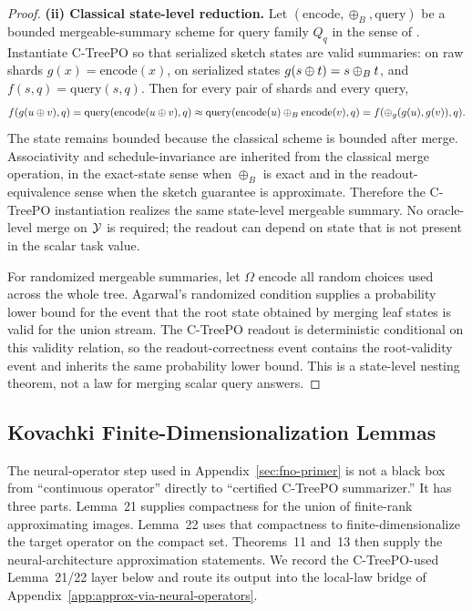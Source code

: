 \begin{proof}
\textbf{(ii) Classical state-level reduction.}
Let $(\mathrm{encode},\oplus_B,\mathrm{query})$ be a bounded mergeable-summary
scheme for query family $Q_q$ in the sense of
\citet{Agarwal2013MergeableTODS}. Instantiate C-TreePO so that serialized
sketch states are valid summaries: on raw shards $g(x)=\mathrm{encode}(x)$,
on serialized states $g(s\oplus t)=s\oplus_B t$, and
$f(s,q)=\mathrm{query}(s,q)$. Then for every pair of shards and every query,
\[
f(g(u\oplus v),q)
  = \mathrm{query}(\mathrm{encode}(u\oplus v),q)
  \approx
    \mathrm{query}(\mathrm{encode}(u)\oplus_B\mathrm{encode}(v),q)
  = f(\oplus_g(g(u),g(v)),q).
\]
The state remains bounded because the classical scheme is bounded after
merge. Associativity and schedule-invariance are inherited from the classical
merge operation, in the exact-state sense when $\oplus_B$ is exact and in the
readout-equivalence sense when the sketch guarantee is approximate. Therefore
the C-TreePO instantiation realizes the same state-level mergeable summary.
No oracle-level merge on $\mathcal{Y}$ is required; the readout can depend on state
that is not present in the scalar task value.

For randomized mergeable summaries, let $\Omega$ encode all random choices used
across the whole tree. Agarwal's randomized condition supplies a probability
lower bound for the event that the root state obtained by merging leaf states
is valid for the union stream. The C-TreePO readout is deterministic conditional
on this validity relation, so the readout-correctness event contains the
root-validity event and inherits the same probability lower bound. This is a
state-level nesting theorem, not a law for merging scalar query answers.
\end{proof}

\subsection{Kovachki Finite-Dimensionalization Lemmas}\label{app:kovachki-finite-dimensionalization}

The neural-operator step used in Appendix~\ref{sec:fno-primer} is not a
black box from ``continuous operator'' directly to ``certified
C-TreePO summarizer.'' It has three parts. Lemma~21 supplies compactness
for the union of finite-rank approximating images. Lemma~22 uses that
compactness to finite-dimensionalize the target operator on the compact
set. Theorems~11 and~13 then supply the neural-architecture
approximation statements. We record the C-TreePO-used Lemma~21/22 layer
below and route its output into the local-law bridge of
Appendix~\ref{app:approx-via-neural-operators}.


